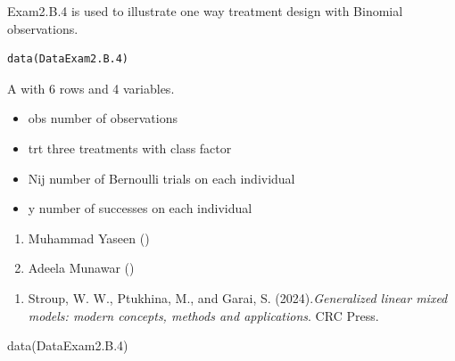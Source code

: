 \documentclass[a4paper]{book}
\begin{document}
%
\begin{Description}
Exam2.B.4 is used to illustrate one way treatment design with Binomial observations.
\end{Description}
%
\begin{Usage}
\begin{verbatim}
data(DataExam2.B.4)
\end{verbatim}
\end{Usage}
%
\begin{Format}
A  with 6 rows and 4 variables.
\end{Format}
%
\begin{Details}
\begin{itemize}

\item{} obs number of observations
\item{} trt three treatments with class factor
\item{} Nij  number of Bernoulli trials on each individual
\item{} y  number of successes on each individual

\end{itemize}

\end{Details}
%
\begin{Author}
\begin{enumerate}

\item{}  Muhammad Yaseen ()
\item{} Adeela Munawar ()

\end{enumerate}

\end{Author}
%
\begin{References}
\begin{enumerate}

\item{} Stroup, W. W., Ptukhina, M., and Garai, S. (2024).\emph{Generalized linear mixed models: modern concepts, methods and applications}.
CRC Press.

\end{enumerate}

\end{References}
%
\begin{SeeAlso}
\end{SeeAlso}
%
\begin{Examples}
\begin{ExampleCode}
data(DataExam2.B.4)
\end{ExampleCode}
\end{Examples}
\end{document}
